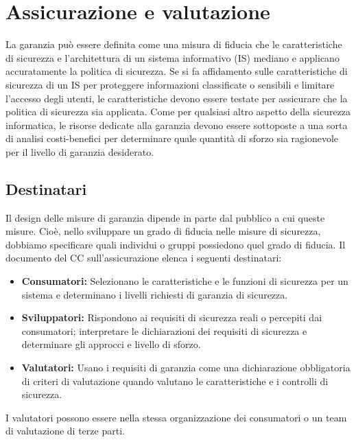 \section{Assicurazione e valutazione}
La garanzia può essere definita come una misura di fiducia che le caratteristiche di sicurezza e l'architettura di un sistema informativo (IS) mediano e applicano accuratamente la politica di sicurezza. Se si fa affidamento sulle caratteristiche di sicurezza di un IS per proteggere informazioni classificate o sensibili e limitare l'accesso degli utenti, le caratteristiche devono essere testate per assicurare che la politica di sicurezza sia applicata. Come per qualsiasi altro aspetto della sicurezza informatica, le risorse dedicate alla garanzia devono essere sottoposte a una sorta di analisi costi-benefici per determinare quale quantità di sforzo sia ragionevole per il livello di garanzia desiderato.
\subsection{Destinatari}
Il design delle misure di garanzia dipende in parte dal pubblico a cui queste misure. Cioè, nello sviluppare un grado di fiducia nelle misure di sicurezza, dobbiamo specificare quali individui o gruppi possiedono quel grado di fiducia. Il documento del CC sull'assicurazione elenca i seguenti destinatari:
\begin{itemize}
    \item \textbf{Consumatori:} Selezionano le caratteristiche e le funzioni di sicurezza per un sistema e determinano i livelli richiesti di garanzia di sicurezza.
    
    \item \textbf{Sviluppatori:} Rispondono ai requisiti di sicurezza reali o percepiti dai consumatori; interpretare le dichiarazioni dei requisiti di sicurezza e determinare gli approcci e livello di sforzo.
    
    \item \textbf{Valutatori:} Usano i requisiti di garanzia come una dichiarazione obbligatoria di criteri di valutazione quando valutano le caratteristiche e i controlli di sicurezza.
\end{itemize}
I valutatori possono essere nella stessa organizzazione dei consumatori o un team di valutazione di terze parti.
\newpage
